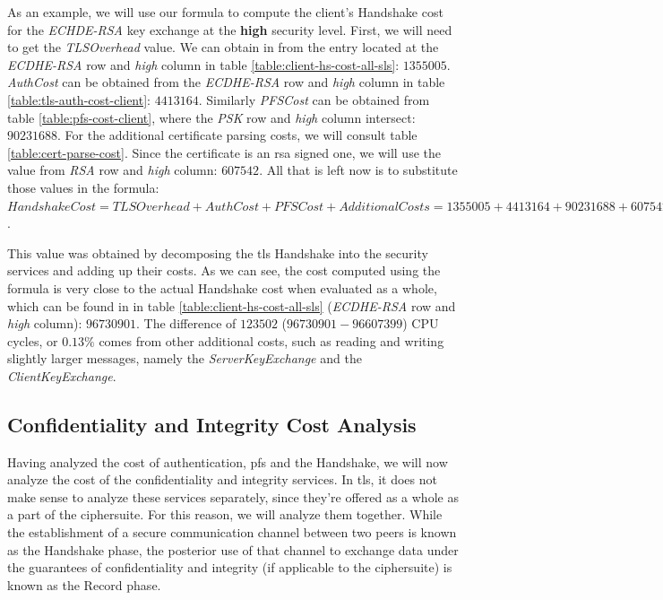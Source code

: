 As an example, we will use our formula to compute the client's Handshake cost for the \textit{ECHDE-RSA}
key exchange at the \textbf{high} security level.
First, we will need to get the \textit{TLSOverhead} value. We can obtain in from the entry located at the
\textit{ECDHE-RSA} row and \textit{high} column in table \ref{table:client-hs-cost-all-sls}: $1355005$. \textit{AuthCost} can be obtained
from the \textit{ECDHE-RSA} row and \textit{high} column in table \ref{table:tls-auth-cost-client}: $4413164$. Similarly \textit{PFSCost}
can be obtained from table \ref{table:pfs-cost-client}, where the \textit{PSK} row and \textit{high} column intersect: $90231688$.
For the additional certificate parsing costs, we will consult table \ref{table:cert-parse-cost}. Since the certificate is an \gls{rsa} signed one,
we will use the value from \textit{RSA} row and \textit{high} column: $607542$. All that is left now is to substitute those values in the formula:
$Handshake Cost = TLS Overhead + Auth Cost + PFS Cost + Additional Costs = 1355005 + 4413164 + 90231688 + 607542 = 96607399$.

This value was obtained by decomposing the \gls{tls} Handshake into the security services and adding up their costs. As we can see,
the cost computed using the formula is very close to the actual Handshake cost when evaluated as a whole,
which can be found in in table \ref{table:client-hs-cost-all-sls} (\textit{ECDHE-RSA} row and \textit{high} column): $96730901$.
The difference of $123502$ ($96730901-96607399$) CPU cycles, or $0.13\%$ comes from other additional costs, such as reading and writing slightly larger
messages, namely the \textit{ServerKeyExchange} and the \textit{ClientKeyExchange}.

\subsection{Confidentiality and Integrity Cost Analysis} \label{sec:confid-costs}

Having analyzed the cost of authentication, \gls{pfs} and the Handshake, we will now analyze the cost of the confidentiality and integrity services.
In \gls{tls}, it does not make sense to analyze these services separately, since they're offered as a whole as a part of the ciphersuite.
For this reason, we will analyze them together. While the establishment of a secure communication channel between two peers is known as the
Handshake phase, the posterior use of that channel to exchange data under the guarantees of confidentiality and integrity (if applicable to the ciphersuite) 
is known as the Record phase.

